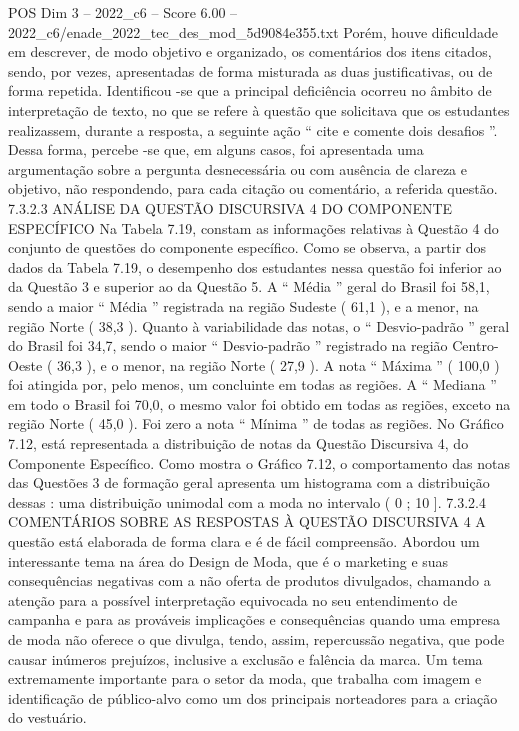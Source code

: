 \begin{textsample}{POS Dim 3 – 2022\_c6 – Score 6.00 – 2022\_c6/enade\_2022\_tec\_des\_mod\_5d9084e355.txt}
Porém, houve dificuldade em descrever, de modo objetivo e organizado, os comentários dos itens citados, sendo, por vezes, apresentadas de forma misturada as duas justificativas, ou de forma repetida.
Identificou -se que a principal deficiência ocorreu no âmbito de interpretação de texto, no que se refere à questão que solicitava que os estudantes realizassem, durante a resposta, a seguinte ação “ cite e comente dois desafios ”.
Dessa forma, percebe -se que, em alguns casos, foi apresentada uma argumentação sobre a pergunta desnecessária ou com ausência de clareza e objetivo, não respondendo, para cada citação ou comentário, a referida questão. 7.3.2.3 ANÁLISE DA QUESTÃO DISCURSIVA 4 DO COMPONENTE ESPECÍFICO Na Tabela 7.19, constam as informações relativas à Questão 4 do conjunto de questões do componente específico.
Como se observa, a partir dos dados da Tabela 7.19, o desempenho dos estudantes nessa questão foi inferior ao da Questão 3 e superior ao da Questão 5.
A “ Média ” geral do Brasil foi 58,1, sendo a maior “ Média ” registrada na região Sudeste ( 61,1 ), e a menor, na região Norte ( 38,3 ).
Quanto à variabilidade das notas, o “ Desvio-padrão ” geral do Brasil foi 34,7, sendo o maior “ Desvio-padrão ” registrado na região Centro-Oeste ( 36,3 ), e o menor, na região Norte ( 27,9 ).
A nota “ Máxima ” ( 100,0 ) foi atingida por, pelo menos, um concluinte em todas as regiões.
A “ Mediana ” em todo o Brasil foi 70,0, o mesmo valor foi obtido em todas as regiões, exceto na região Norte ( 45,0 ).
Foi zero a nota “ Mínima ” de todas as regiões.
No Gráfico 7.12, está representada a distribuição de notas da Questão Discursiva 4, do Componente Específico.
Como mostra o Gráfico 7.12, o comportamento das notas das Questões 3 de formação geral apresenta um histograma com a distribuição dessas : uma distribuição unimodal com a moda no intervalo ( 0 ; 10 ]. 7.3.2.4 COMENTÁRIOS SOBRE AS RESPOSTAS À QUESTÃO DISCURSIVA 4 A questão está elaborada de forma clara e é de fácil compreensão.
Abordou um interessante tema na área do Design de Moda, que é o marketing e suas consequências negativas com a não oferta de produtos divulgados, chamando a atenção para a possível interpretação equivocada no seu entendimento de campanha e para as prováveis implicações e consequências quando uma empresa de moda não oferece o que divulga, tendo, assim, repercussão negativa, que pode causar inúmeros prejuízos, inclusive a exclusão e falência da marca.
Um tema extremamente importante para o setor da moda, que trabalha com imagem e identificação de público-alvo como um dos principais norteadores para a criação do vestuário.

\end{textsample}
